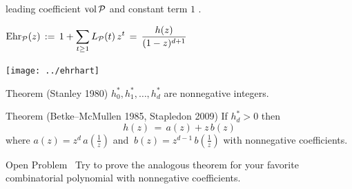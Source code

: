\documentclass[landscape]{foils}
\def\red{\color{red}}
\def\blue{\color{blue}}
\def\black{\color{black}}
\def\bm{\blue $}
\def\em{$ \black }
\def\be{\blue \[}
\def\ee{\] \black}                               %
\begin{document}
\vspace{-.4in}
\hspace{1.8in}
leading coefficient \bm \vol \P \em %
and constant term \bm 1 \em\!\!.

\vspace{-.1in}
\hspace{2.2in}
\bm \displaystyle \Ehr_\P (z) \, := \, 1 + \sum_{ t \ge 1 } L_\P (t) \, z^t \, = \, \dfrac{ h(z) }{ (1-z)^{ d + 1 } } \em

\vspace{-2.9in}
\texttt{[image: ../ehrhart]}

\red Theorem \black (Stanley 1980) \bm h^*_0, h^*_1, \dots, h^*_d \em are nonnegative integers.

\red Theorem \black (Betke--McMullen 1985, Stapledon 2009)
If \bm h^*_d > 0 \em then
\be
  h(z) \, = \, a(z) + z \, b(z)
\ee
where \bm a(z) = z^d \, a(\frac 1 z) \em and \bm \ b(z) = z^{ d-1 } \, b(\frac 1 z) \em with nonnegative coefficients.

\red Open Problem \black \
Try to prove the analogous theorem for your favorite combinatorial polynomial with nonnegative coefficients.


\end{document}
